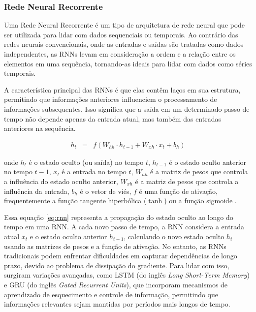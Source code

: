 \subsubsection{Rede Neural Recorrente}


Uma Rede Neural Recorrente é um tipo de arquitetura de rede neural que pode ser utilizada para lidar com dados sequenciais ou temporais. Ao contrário das redes neurais convencionais, onde as entradas e saídas são tratadas como dados independentes, as RNNs levam em consideração a ordem e a relação entre os elementos em uma sequência, tornando-as ideais para lidar com dados como séries temporais.

A característica principal das RNNs é que elas contêm laços em sua estrutura, permitindo que informações anteriores influenciem o processamento de informações subsequentes. Isso significa que a saída em um determinado passo de tempo não depende apenas da entrada atual, mas também das entradas anteriores na sequência.


\begin{eqnarray}
	h_t &=& f(W_{hh} \cdot h_{t-1} + W_{xh} \cdot x_t + b_h)\label{eq:rnn}
\end{eqnarray}

\noindent onde \( h_t \) é o estado oculto (ou saída) no tempo \( t \), \( h_{t-1} \) é o estado oculto anterior no tempo \( t-1 \), \( x_t \) é a entrada no tempo \( t \), \( W_{hh} \) é a matriz de pesos que controla a influência do estado oculto anterior, \( W_{xh} \) é a matriz de pesos que controla a influência da entrada, \( b_h \) é o vetor de viés, \( f \) é uma função de ativação, frequentemente a função tangente hiperbólica ($\operatorname{tanh}$) ou a função sigmoide \cite{lstm}.


Essa equação \eqref{eq:rnn} representa a propagação do estado oculto ao longo do tempo em uma RNN. A cada novo passo de tempo, a RNN considera a entrada atual \( x_t \) e o estado oculto anterior \( h_{t-1} \), calculando o novo estado oculto \( h_t \) usando as matrizes de pesos e a função de ativação.
No entanto, as RNNs tradicionais podem enfrentar dificuldades em capturar dependências de longo prazo, devido ao problema de dissipação do gradiente. Para lidar com isso, surgiram variações avançadas, como LSTM (do inglês \textit{Long Short-Term Memory})  e GRU (do inglês \textit{Gated Recurrent Units}), que incorporam mecanismos de aprendizado de esquecimento e controle de informação, permitindo que informações relevantes sejam mantidas por períodos mais longos de tempo.

